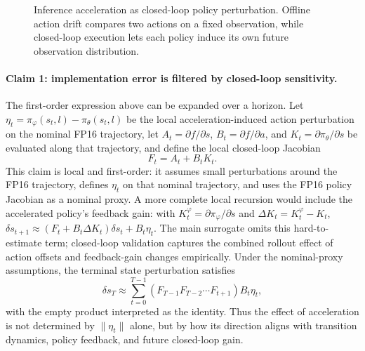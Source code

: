 \documentclass[10pt]{article}
\begin{document}
\begin{figure}[H]
{}
    \caption{Inference acceleration as closed-loop policy perturbation. Offline action drift compares two actions on a fixed observation, while closed-loop execution lets each policy induce its own future observation distribution.}
    \label{fig:policy-perturbation}
\end{figure}

\paragraph{Claim 1: implementation error is filtered by closed-loop sensitivity.}
The first-order expression above can be expanded over a horizon. Let $\eta_t=\pi_\varphi(s_t,l)-\pi_\theta(s_t,l)$ be the local acceleration-induced action perturbation on the nominal FP16 trajectory, let $A_t=\partial f/\partial s$, $B_t=\partial f/\partial a$, and $K_t=\partial \pi_\theta/\partial s$ be evaluated along that trajectory, and define the local closed-loop Jacobian
\begin{equation}
    F_t = A_t + B_tK_t .
\end{equation}
This claim is local and first-order: it assumes small perturbations around the FP16 trajectory, defines $\eta_t$ on that nominal trajectory, and uses the FP16 policy Jacobian as a nominal proxy. A more complete local recursion would include the accelerated policy's feedback gain: with $K_t^\varphi=\partial\pi_\varphi/\partial s$ and $\Delta K_t=K_t^\varphi-K_t$,
$\delta s_{t+1}\approx(F_t+B_t\Delta K_t)\delta s_t+B_t\eta_t$.
The main surrogate omits this hard-to-estimate term; closed-loop validation captures the combined rollout effect of action offsets and feedback-gain changes empirically. Under the nominal-proxy assumptions, the terminal state perturbation satisfies
\begin{equation}
    \delta s_T
    \approx
    \sum_{t=0}^{T-1}
    \left(F_{T-1}F_{T-2}\cdots F_{t+1}\right) B_t\eta_t ,
    \label{eq:sensitivity-propagation}
\end{equation}
with the empty product interpreted as the identity. Thus the effect of acceleration is not determined by $\|\eta_t\|$ alone, but by how its direction aligns with transition dynamics, policy feedback, and future closed-loop gain.
\end{document}
